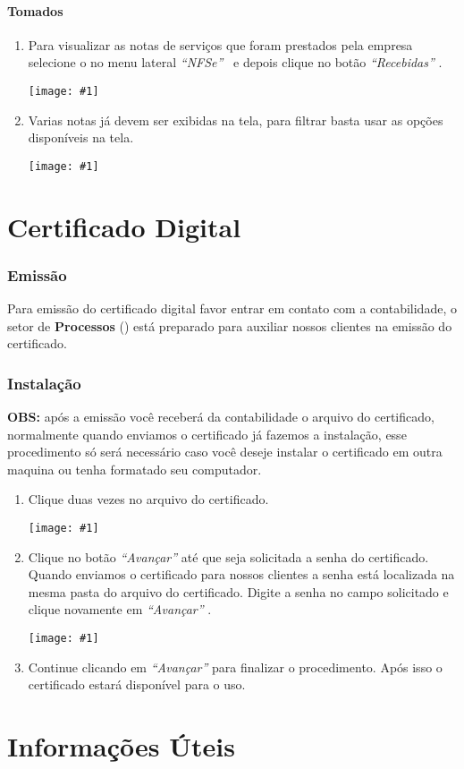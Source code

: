 \documentclass{article}
\newcommand{\itasp}[1]{
  \textit{``#1''}
}
\newcommand{\imagem}[2]{
  \begin{center}
    \texttt{[image: \#1]}
  \end{center}
}
\newcommand{\parte}[1]{
  \pagebreak
  \vfill
  \partfont{\centering}
  \vspace*{\fill}
    \part{#1}    
  \vspace*{\fill}
  \vfill
  \pagebreak
}
\begin{document}
  \subsection{Tomados}
  \begin{enumerate}
    \item Para visualizar as notas de serviços que foram prestados pela empresa selecione o no menu lateral \itasp{NFSe} \ e depois clique no botão \itasp{Recebidas}. \imagem{menu-nfe.PNG}{.2}
    \item Varias notas já devem ser exibidas na tela, para filtrar basta usar as opções disponíveis na tela. \imagem{filtro-nfse-rec.PNG}{.9}
  \end{enumerate}

\parte{Certificado Digital}
\section{Emissão}
\label{sec:emit-cert}
Para emissão do certificado digital favor entrar em contato com a contabilidade, o setor de \textbf{Processos} (\emailprocessos) está preparado para auxiliar nossos clientes na emissão do certificado.
\section{Instalação}
\label{sec:install-cert}
\textbf{OBS:} após a emissão você receberá da contabilidade o arquivo do certificado, normalmente quando enviamos o certificado já fazemos a instalação, esse procedimento só será necessário caso você deseje instalar o certificado em outra maquina ou tenha formatado seu computador.
\begin{enumerate}
  \item Clique duas vezes no arquivo do certificado. \imagem{cert-img}{1}
  \item Clique no botão \itasp{Avançar} até que seja solicitada a senha do certificado. Quando enviamos o certificado para nossos clientes a senha está localizada na mesma pasta do arquivo do certificado. Digite a senha no campo solicitado e clique novamente em \itasp{Avançar}. \imagem{senha-cert}{0.5}
  \item Continue clicando em \itasp{Avançar} para finalizar o procedimento. Após isso o certificado estará disponível para o uso.
\end{enumerate}

\parte{Informações Úteis}
\end{document}

